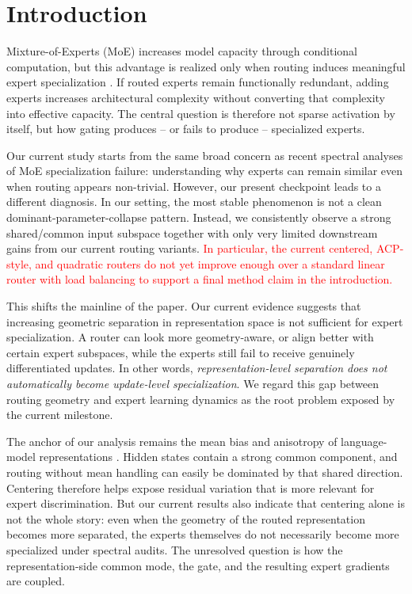 \section{Introduction}
\label{sec:intro}

Mixture-of-Experts (MoE) increases model capacity through conditional computation, but this advantage is realized only when routing induces meaningful expert specialization \citep{fedus2022switch}. If routed experts remain functionally redundant, adding experts increases architectural complexity without converting that complexity into effective capacity. The central question is therefore not sparse activation by itself, but how gating produces -- or fails to produce -- specialized experts.

Our current study starts from the same broad concern as recent spectral analyses of MoE specialization failure: understanding why experts can remain similar even when routing appears non-trivial. However, our present checkpoint leads to a different diagnosis. In our setting, the most stable phenomenon is not a clean dominant-parameter-collapse pattern. Instead, we consistently observe a strong shared/common input subspace together with only very limited downstream gains from our current routing variants. \textcolor{red}{In particular, the current centered, ACP-style, and quadratic routers do not yet improve enough over a standard linear router with load balancing to support a final method claim in the introduction.}

This shifts the mainline of the paper. Our current evidence suggests that increasing geometric separation in representation space is not sufficient for expert specialization. A router can look more geometry-aware, or align better with certain expert subspaces, while the experts still fail to receive genuinely differentiated updates. In other words, \emph{representation-level separation does not automatically become update-level specialization}. We regard this gap between routing geometry and expert learning dynamics as the root problem exposed by the current milestone.

The anchor of our analysis remains the mean bias and anisotropy of language-model representations \citep{ethayarajh2019contextual,chi2022representation}. Hidden states contain a strong common component, and routing without mean handling can easily be dominated by that shared direction. Centering therefore helps expose residual variation that is more relevant for expert discrimination. But our current results also indicate that centering alone is not the whole story: even when the geometry of the routed representation becomes more separated, the experts themselves do not necessarily become more specialized under spectral audits. The unresolved question is how the representation-side common mode, the gate, and the resulting expert gradients are coupled.

